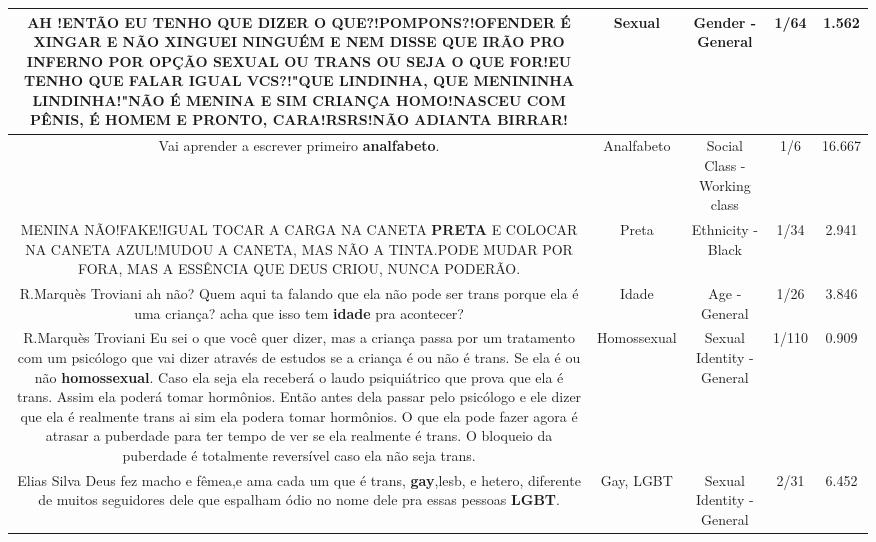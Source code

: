 \documentclass[11pt]{article}
\newlength\mylength
\begin{document}
\begin{center}
\begin{longtable}{|C{.65\mylength}|C{.30\mylength}|C{.12\mylength}|C{.12\mylength}|C{.12\mylength}|}
  \small AH !ENTÃO EU TENHO QUE DIZER O QUE?!POMPONS?!OFENDER É XINGAR E NÃO XINGUEI NINGUÉM E NEM DISSE QUE IRÃO PRO INFERNO POR OPÇÃO \textbf{SEXUAL} OU TRANS OU SEJA O QUE FOR!EU TENHO QUE FALAR IGUAL VCS?!"QUE LINDINHA, QUE MENININHA LINDINHA!"NÃO É MENINA E SIM CRIANÇA HOMO!NASCEU COM PÊNIS, É HOMEM E PRONTO, CARA!RSRS!NÃO ADIANTA BIRRAR!\normalsize   & Sexual & Gender - General & 1/64 & 1.562 \\  \hline
  \small Vai aprender a escrever primeiro \textbf{analfabeto}.\normalsize   & Analfabeto & Social Class - Working class & 1/6 & 16.667 \\  \hline
  \small MENINA NÃO!FAKE!IGUAL TOCAR A CARGA NA CANETA \textbf{PRETA} E COLOCAR NA CANETA AZUL!MUDOU A CANETA, MAS NÃO A TINTA.PODE MUDAR POR FORA, MAS A ESSÊNCIA QUE DEUS CRIOU, NUNCA PODERÃO.\normalsize   & Preta & Ethnicity - Black & 1/34 & 2.941 \\  \hline
  \small R.Marquès Troviani ah não?  Quem aqui ta falando que ela não pode ser trans porque ela é uma criança?  acha que isso tem \textbf{idade} pra acontecer?\normalsize   & Idade & Age - General & 1/26 & 3.846 \\  \hline
  \small R.Marquès Troviani Eu sei o que você quer dizer, mas a criança passa por um tratamento com um  psicólogo que vai dizer através de estudos se a criança é ou não é trans.  Se ela é ou não \textbf{homossexual}.  Caso ela seja ela receberá o laudo psiquiátrico que prova que ela é trans. Assim ela poderá tomar hormônios.  Então antes dela passar pelo psicólogo e ele dizer que ela é realmente trans ai sim ela podera tomar hormônios.  O que ela pode fazer agora é atrasar a puberdade para ter tempo de ver se ela realmente é trans.  O bloqueio da puberdade é totalmente reversível caso ela não seja trans.\normalsize   & Homossexual & Sexual Identity - General & 1/110 & 0.909 \\  \hline
  \small Elias Silva Deus fez macho e fêmea,e ama cada um que é trans, \textbf{gay},lesb, e hetero, diferente de muitos seguidores dele que espalham ódio no nome dele pra essas pessoas \textbf{LGBT}.\normalsize   & Gay, LGBT & Sexual Identity - General & 2/31 & 6.452 \\  \hline

\end{longtable}
\end{center}
\end{document}
